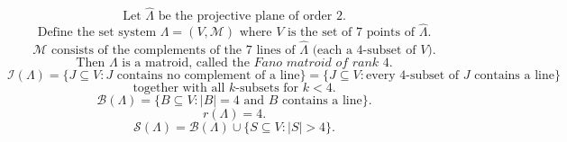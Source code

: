 $$
\text{Let }\hat{\Lambda}\text{ be the projective plane of order }2.
$$
$$
\text{Define the set system }\Lambda = (V, \mathcal{M})\text{ where }V\text{ is the set of }7\text{ points of }\hat{\Lambda}.
$$
$$
\mathcal{M}\text{ consists of the complements of the }7\text{ lines of }\hat{\Lambda}\text{ (each a }4\text{-subset of }V).
$$
$$
\text{Then }\Lambda\text{ is a matroid, called the }\textit{Fano matroid of rank }4.
$$
$$
\mathcal{I}(\Lambda) = \{J \subseteq V : J\text{ contains no complement of a line}\}
= \{J \subseteq V : \text{every }4\text{-subset of }J\text{ contains a line}\}
$$
$$
\text{together with all }k\text{-subsets for }k < 4.
$$
$$
\mathcal{B}(\Lambda) = \{B \subseteq V : |B| = 4\text{ and }B\text{ contains a line}\}.
$$
$$
r(\Lambda) = 4.
$$
$$
\mathcal{S}(\Lambda) = \mathcal{B}(\Lambda) \cup \{S \subseteq V : |S| > 4\}.
$$
